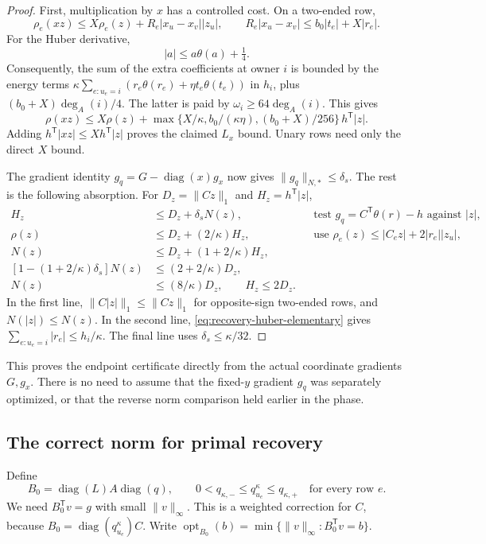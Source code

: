 \documentclass[11pt]{article}
\theoremstyle{definition}\newtheorem{definition}[theorem]{Definition}
\theoremstyle{remark}\newtheorem{remark}[theorem]{Remark}
\begin{document}
\begin{proof}
First, multiplication by $x$ has a controlled cost. On a two-ended row,
\[
 \rho_e(xz)\le X\rho_e(z)+R_e|x_u-x_v||z_u|,
 \qquad R_e|x_u-x_v|\le b_0|t_e|+X|r_e|.
\]
For the Huber derivative,
\begin{equation}\label{eq:recovery-huber-elementary}
 |a|\le a\theta(a)+\tfrac14.
\end{equation}
Consequently, the sum of the extra coefficients at owner $i$ is bounded
by the energy terms $\kappa\sum_{e:u_e=i}(r_e\theta(r_e)+
\eta t_e\theta(t_e))$ in $h_i$, plus
$(b_0+X)\deg_A(i)/4$. The latter is paid by
$\omega_i\ge64\deg_A(i)$. This gives
\[
 \rho(xz)\le X\rho(z)+
 \max\{X/\kappa,b_0/(\kappa\eta),(b_0+X)/256\}\,h^{\mathsf T}|z|.
\]
Adding $h^{\mathsf T}|xz|\le Xh^{\mathsf T}|z|$ proves the claimed
$L_x$ bound. Unary rows need only the direct $X$ bound.

The gradient identity $g_q=G-\operatorname{diag}(x)g_x$ now gives
$\|g_q\|_{N,*}\le\delta_s$. The rest is the following absorption.
For $D_z=\|Cz\|_1$ and $H_z=h^{\mathsf T}|z|$,
\begin{align*}
 H_z&\le D_z+\delta_sN(z),
       &&\text{test }g_q=C^{\mathsf T}\theta(r)-h\text{ against }|z|,\\
 \rho(z)&\le D_z+(2/\kappa)H_z,
       &&\text{use }\rho_e(z)\le|C_ez|+2|r_e||z_u|,\\
 N(z)&\le D_z+(1+2/\kappa)H_z,\\
 [1-(1+2/\kappa)\delta_s]N(z)&\le(2+2/\kappa)D_z,\\
 N(z)&\le(8/\kappa)D_z,\qquad H_z\le2D_z.
\end{align*}
In the first line, $\|C|z|\|_1\le\|Cz\|_1$ for opposite-sign
two-ended rows, and $N(|z|)\le N(z)$. In the second line,
\eqref{eq:recovery-huber-elementary} gives
$\sum_{e:u_e=i}|r_e|\le h_i/\kappa$. The final line uses
$\delta_s\le\kappa/32$.
\end{proof}

This proves the endpoint certificate directly from the actual coordinate
gradients $G,g_x$. There is no need to assume that the fixed-$y$ gradient
$g_q$ was separately optimized, or that the reverse norm comparison held
earlier in the phase.

\subsection{The correct norm for primal recovery}

Define
\[
 B_0=\operatorname{diag}(L)A\operatorname{diag}(q),\qquad
 0<q_{\kappa,-}\le q_{u_e}^{\kappa}\le q_{\kappa,+}\quad\text{for every row }e.
\]
We need $B_0^{\mathsf T}v=g$ with small $\|v\|_\infty$.
This is a weighted correction for $C$, because
$B_0=\operatorname{diag}(q_{u_e}^{\kappa})C$.
Write $\operatorname{opt}_{B_0}(b)=
\min\{\|v\|_\infty:B_0^{\mathsf T}v=b\}$.
\end{document}
